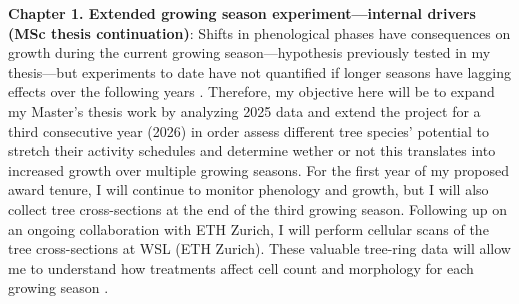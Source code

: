 \documentclass[12pt]{article}
\begin{document}
\textbf{Chapter 1. Extended growing season experiment---internal drivers (MSc thesis continuation)}:
Shifts in phenological phases have consequences on growth during the current growing season---hypothesis previously tested in my thesis---but experiments to date have not quantified if longer seasons have lagging effects over the following years \cite{chapin_ecology_1990,landhausser_partitioning_2012,lawrence_variable_2018,martens_first-year_2007,schott_premature_2013}. Therefore, my objective here will be to expand my Master's thesis work by analyzing 2025 data and extend the project for a third consecutive year (2026) in order assess different tree species’ potential to stretch their activity schedules and determine wether or not this translates into increased growth over multiple growing seasons. For the first year of my proposed award tenure, I will continue to monitor phenology and growth, but I will also collect tree cross-sections at the end of the third growing season. Following up on an ongoing collaboration with ETH Zurich, I will perform cellular scans of the tree cross-sections at WSL (ETH Zurich). These valuable tree-ring data will allow me to understand how treatments affect cell count and morphology for each growing season \cite{silvestro_longer_2023}. 
\end{document}

